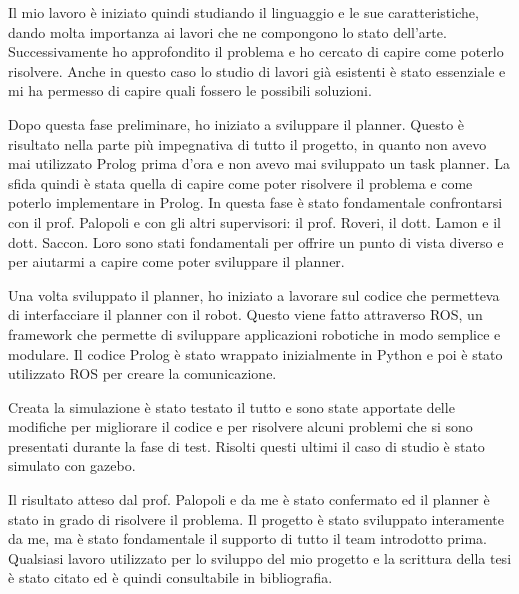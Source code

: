 Il mio lavoro è iniziato quindi studiando il linguaggio e le sue caratteristiche, dando molta importanza ai lavori che ne compongono lo stato dell'arte. 
Successivamente ho approfondito il problema e ho cercato di capire come poterlo risolvere. Anche in questo caso lo studio di lavori già esistenti è stato essenziale e mi ha permesso di capire quali fossero le possibili soluzioni.

Dopo questa fase preliminare, ho iniziato a sviluppare il planner. Questo è risultato nella parte più impegnativa di tutto il progetto, in quanto non avevo mai utilizzato Prolog prima d'ora e non avevo mai sviluppato un task planner.
La sfida quindi è stata quella di capire come poter risolvere il problema e come poterlo implementare in Prolog. In questa fase è stato fondamentale confrontarsi con il prof. Palopoli e con gli altri supervisori: il prof. Roveri, il dott. Lamon e il dott. Saccon.
Loro sono stati fondamentali per offrire un punto di vista diverso e per aiutarmi a capire come poter sviluppare il planner. 

Una volta sviluppato il planner, ho iniziato a lavorare sul codice che permetteva di interfacciare il planner con il robot. Questo viene fatto attraverso ROS, un framework che permette di sviluppare applicazioni robotiche in modo semplice e modulare.
Il codice Prolog è stato wrappato inizialmente in Python e poi è stato utilizzato ROS per creare la comunicazione.

Creata la simulazione è stato testato il tutto e sono state apportate delle modifiche per migliorare il codice e per risolvere alcuni problemi che si sono presentati durante la fase di test. 
Risolti questi ultimi il caso di studio è stato simulato con gazebo. 

Il risultato atteso dal prof. Palopoli e da me è stato confermato ed il planner è stato in grado di risolvere il problema. 
Il progetto è stato sviluppato interamente da me, ma è stato fondamentale il supporto di tutto il team introdotto prima. 
Qualsiasi lavoro utilizzato per lo sviluppo del mio progetto e la scrittura della tesi è stato citato ed è quindi consultabile in bibliografia.

